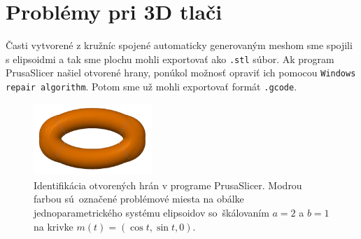 \section{Problémy pri 3D tlači}
Časti vytvorené z kružníc spojené automaticky generovaným meshom sme spojili s elipsoidmi a tak sme plochu mohli exportovať ako \verb|.stl| súbor. Ak program PrusaSlicer našiel otvorené hrany, ponúkol možnosť opraviť ich pomocou \verb|Windows repair algorithm|. Potom sme už mohli exportovať formát \verb|.gcode|. 
\begin{figure}[h]
	\centering
	\includegraphics[width=0.4\textwidth]{images/otvorene_hrany2.png}
	\caption[Otvorené hrany.]{Identifikácia otvorených hrán v programe PrusaSlicer. Modrou farbou sú~označené problémové miesta na obálke jednoparametrického systému elipsoidov so~škálovaním $a = 2$ a $b =1$ na krivke $m(t) = (\cos t, \sin t, 0) $.}
	\label{fig:open_edges}
\end{figure}

